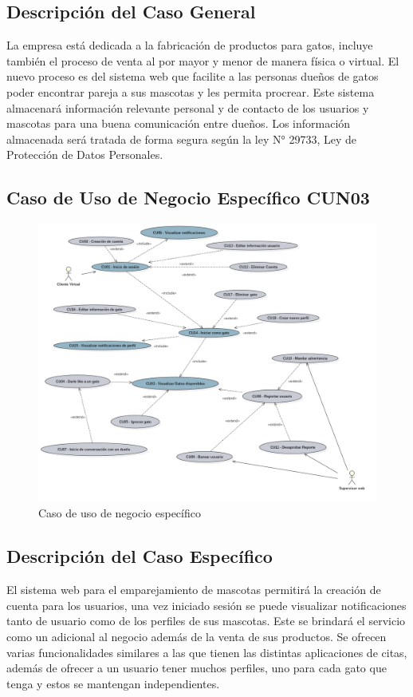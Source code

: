 \documentclass{article}
\begin{document}
\subsection{Descripción del Caso General}
La empresa está dedicada a la fabricación de productos para gatos, incluye también el proceso de venta al por mayor y menor de manera física o virtual.
El nuevo proceso es del sistema web que facilite a las personas dueños de gatos poder encontrar pareja a sus mascotas y les permita procrear. Este sistema almacenará información relevante personal y de contacto de los usuarios y mascotas para una buena comunicación entre dueños. Los información almacenada será tratada de forma segura según la ley N° 29733, Ley de Protección de Datos Personales.
\clearpage
\subsection{Caso de Uso de Negocio Específico CUN03}
\vspace{5mm}
\begin{figure}[h]
    \begin{center}
        \includegraphics[width=\textwidth]{images/Caso de uso especifico.png}
        \caption{Caso de uso de negocio específico}
    \end{center}
\end{figure}
\subsection{Descripción del Caso Específico}
El sistema web para el emparejamiento de mascotas permitirá la creación de cuenta para los usuarios, una vez iniciado sesión se puede visualizar notificaciones tanto de usuario como de los perfiles de sus mascotas.
Este se brindará el servicio como un adicional al negocio además de la venta de sus productos. Se ofrecen varias funcionalidades similares a las que tienen las distintas aplicaciones de citas, además de ofrecer a un usuario tener muchos perfiles, uno para cada gato que tenga y estos se mantengan independientes.
\clearpage

\end{document}
